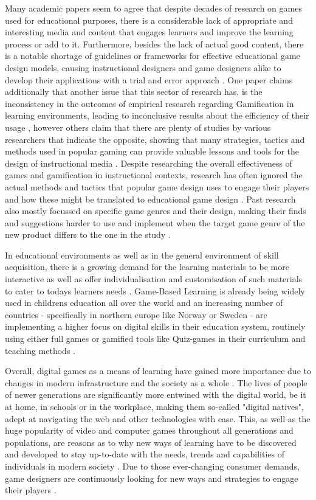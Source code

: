 Many academic papers seem to agree that despite decades of research on games used for educational purposes, there is a considerable lack of appropriate and interesting media and content that engages learners and improve the learning process or add to it. Furthermore, besides the lack of actual good content, there is a notable shortage of guidelines or frameworks for effective educational game design models, causing instructional designers and game designers alike to develop their applications with a trial and error approach \cite{aspects} \cite{framework} \cite{online} \cite{model} \cite{equilibrium}.
One paper claims additionally that another issue that this sector of research has, is the inconsistency in the outcomes of empirical research regarding Gamification in learning environments, leading to inconclusive results about the efficiency of their usage \cite{equilibrium}, however others claim that there are plenty of studies by various researchers that indicate the opposite, showing that many strategies, tactics and methods used in popular gaming can provide valuable lessons and tools for the design of instructional media \cite{engage}.
Despite researching the overall effectiveness of games and gamification in instructional contexts, research has often ignored the actual methods and tactics that popular game design uses to engage their players and how these might be translated to educational game design \cite{engage}.
Past research also mostly focussed on specific game genres and their design, making their finds and suggestions harder to use and implement when the target game genre of the new product differs to the one in the study \cite{model}.

In educational environments as well as in the general environment of skill acquisition, there is a growing demand for the learning materials to be more interactive as well as offer individualisation and customisation of such materials to cater to todays learners needs \cite{aspects}.
Game-Based Learning is already being widely used in childrens education all over the world \cite{aspects} and an increasing number of countries - specifically in northern europe like Norway or Sweden - are implementing a higher focus on digital skills in their education system, routinely using either full games or gamified tools like Quiz-games in their curriculum and teaching methods \cite{domestic}.

Overall, digital games as a means of learning have gained more importance due to changes in modern infrastructure and the society as a whole \cite{lifelong}.
The lives of people of newer generations are significantly more entwined with the digital world, be it at home, in schools or in the workplace, making them so-called "digital natives", adept at navigating the web and other technologies with ease. This, as well as the huge popularity of video and computer games throughout all generations and populations, are reasons as to why new ways of learning have to be discovered and developed to stay up-to-date with the needs, trends and capabilities of individuals in modern society \cite{aspects} \cite{domestic} \cite{online} \cite{framework}.
Due to those ever-changing consumer demands, game designers are continuously looking for new ways and strategies to engage their players \cite{mmo}.

